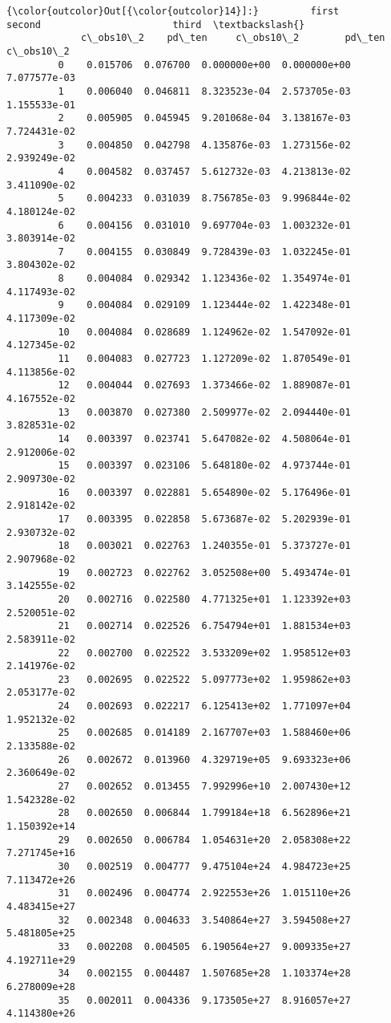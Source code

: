 \documentclass{article}
\begin{document}
            \begin{Verbatim}[commandchars=\\\{\}]
{\color{outcolor}Out[{\color{outcolor}14}]:}         first                  second                       third  \textbackslash{}
             c\_obs10\_2    pd\_ten     c\_obs10\_2        pd\_ten     c\_obs10\_2   
         0    0.015706  0.076700  0.000000e+00  0.000000e+00  7.077577e-03   
         1    0.006040  0.046811  8.323523e-04  2.573705e-03  1.155533e-01   
         2    0.005905  0.045945  9.201068e-04  3.138167e-03  7.724431e-02   
         3    0.004850  0.042798  4.135876e-03  1.273156e-02  2.939249e-02   
         4    0.004582  0.037457  5.612732e-03  4.213813e-02  3.411090e-02   
         5    0.004233  0.031039  8.756785e-03  9.996844e-02  4.180124e-02   
         6    0.004156  0.031010  9.697704e-03  1.003232e-01  3.803914e-02   
         7    0.004155  0.030849  9.728439e-03  1.032245e-01  3.804302e-02   
         8    0.004084  0.029342  1.123436e-02  1.354974e-01  4.117493e-02   
         9    0.004084  0.029109  1.123444e-02  1.422348e-01  4.117309e-02   
         10   0.004084  0.028689  1.124962e-02  1.547092e-01  4.127345e-02   
         11   0.004083  0.027723  1.127209e-02  1.870549e-01  4.113856e-02   
         12   0.004044  0.027693  1.373466e-02  1.889087e-01  4.167552e-02   
         13   0.003870  0.027380  2.509977e-02  2.094440e-01  3.828531e-02   
         14   0.003397  0.023741  5.647082e-02  4.508064e-01  2.912006e-02   
         15   0.003397  0.023106  5.648180e-02  4.973744e-01  2.909730e-02   
         16   0.003397  0.022881  5.654890e-02  5.176496e-01  2.918142e-02   
         17   0.003395  0.022858  5.673687e-02  5.202939e-01  2.930732e-02   
         18   0.003021  0.022763  1.240355e-01  5.373727e-01  2.907968e-02   
         19   0.002723  0.022762  3.052508e+00  5.493474e-01  3.142555e-02   
         20   0.002716  0.022580  4.771325e+01  1.123392e+03  2.520051e-02   
         21   0.002714  0.022526  6.754794e+01  1.881534e+03  2.583911e-02   
         22   0.002700  0.022522  3.533209e+02  1.958512e+03  2.141976e-02   
         23   0.002695  0.022522  5.097773e+02  1.959862e+03  2.053177e-02   
         24   0.002693  0.022217  6.125413e+02  1.771097e+04  1.952132e-02   
         25   0.002685  0.014189  2.167707e+03  1.588460e+06  2.133588e-02   
         26   0.002672  0.013960  4.329719e+05  9.693323e+06  2.360649e-02   
         27   0.002652  0.013455  7.992996e+10  2.007430e+12  1.542328e-02   
         28   0.002650  0.006844  1.799184e+18  6.562896e+21  1.150392e+14   
         29   0.002650  0.006784  1.054631e+20  2.058308e+22  7.271745e+16   
         30   0.002519  0.004777  9.475104e+24  4.984723e+25  7.113472e+26   
         31   0.002496  0.004774  2.922553e+26  1.015110e+26  4.483415e+27   
         32   0.002348  0.004633  3.540864e+27  3.594508e+27  5.481805e+25   
         33   0.002208  0.004505  6.190564e+27  9.009335e+27  4.192711e+29   
         34   0.002155  0.004487  1.507685e+28  1.103374e+28  6.278009e+28   
         35   0.002011  0.004336  9.173505e+27  8.916057e+27  4.114380e+26   
         

\end{Verbatim}
\end{document}
